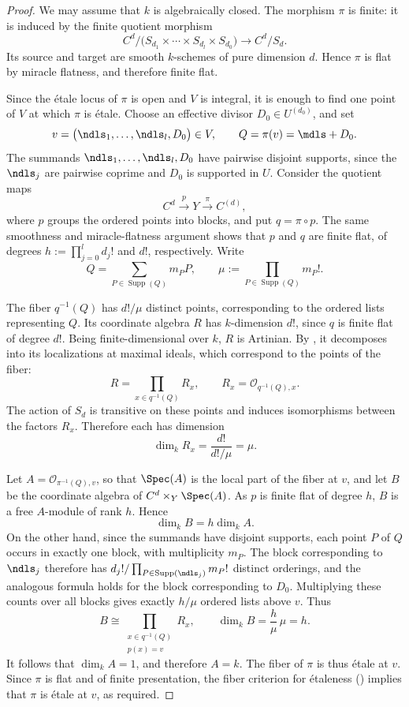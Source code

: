 \begin{proof}
We may assume that $k$ is algebraically closed. The morphism $\pi$ is
finite: it is induced by the finite quotient morphism
\[
C^d/\bigl(S_{d_1}\times\cdots\times S_{d_l}\times S_{d_0}\bigr)
  \longrightarrow C^d/S_d.
\]
Its source and target are smooth $k$-schemes of pure dimension $d$.
Hence $\pi$ is flat by miracle flatness, and therefore finite flat.

Since the étale locus of $\pi$ is open and $V$ is integral, it is enough to
find one point of $V$ at which $\pi$ is étale. Choose an effective
divisor $D_0\in U^{(d_0)}$, and set
\[
v=\bigl(\ndls_1,\ldots,\ndls_l,D_0\bigr)\in V,
\qquad Q=\pi(v)=\mdls+D_0.
\]
The summands $\ndls_1,\ldots,\ndls_l,D_0$ have pairwise disjoint
supports, since the $\ndls_j$ are pairwise coprime and
$D_0$ is supported in $U$. Consider the quotient maps
\[
C^d\xrightarrow{\ p\ }
Y
\xrightarrow{\ \pi\ }C^{(d)},
\]
where $p$ groups the ordered points into blocks, and put $q=\pi\circ p$.
The same smoothness and miracle-flatness argument shows that $p$ and $q$
are finite flat, of degrees $h:=\prod_{j=0}^{l}d_j!$ and $d!$, respectively.
Write
\[
Q=\sum_{P\in\operatorname{Supp}(Q)}m_P P,
\qquad \mu:=\prod_{P\in\operatorname{Supp}(Q)}m_P!.
\]

The fiber $q^{-1}(Q)$ has $d!/\mu$ distinct points, corresponding to the
ordered lists representing $Q$. Its coordinate algebra $R$ has
$k$-dimension $d!$, since $q$ is finite flat of degree $d!$. Being
finite-dimensional over $k$, $R$ is Artinian. By , it
decomposes into its localizations at maximal ideals, which correspond to
the points of the fiber:
\[
R=\prod_{x\in q^{-1}(Q)}R_x,
\qquad R_x=\mathcal O_{q^{-1}(Q),x}.
\]
The action of $S_d$ is transitive on these points and induces isomorphisms
between the factors $R_x$. Therefore each has dimension
\[
\dim_k R_x=\frac{d!}{d!/\mu}=\mu.
\]

Let $A=\mathcal O_{\pi^{-1}(Q),v}$, so that $\Spec(A)$ is the local
part of the fiber at $v$, and let $B$ be the coordinate algebra of
$C^d\times_Y\Spec(A)$. As $p$ is finite flat of degree $h$, $B$ is a free
$A$-module of rank $h$. Hence
\[
\dim_k B=h\dim_k A.
\]
On the other hand, since the summands have disjoint supports, each point
$P$ of $Q$ occurs in exactly one block, with multiplicity $m_P$. The block
corresponding to $\ndls_j$ therefore has
$d_j!/\prod_{P\in\operatorname{Supp}(\ndls_j)}m_P!$ distinct orderings,
and the analogous formula holds for the block corresponding to $D_0$.
Multiplying these counts over all blocks gives exactly $h/\mu$ ordered
lists above $v$. Thus
\[
B\cong\prod_{\substack{x\in q^{-1}(Q)\\p(x)=v}}R_x,
\qquad
\dim_k B=\frac{h}{\mu}\,\mu=h.
\]
It follows that $\dim_k A=1$, and therefore $A=k$. The fiber of $\pi$ is
thus étale at $v$. Since $\pi$ is flat and of finite presentation, the
fiber criterion for étaleness () implies that $\pi$ is
étale at $v$, as required.
\end{proof}

